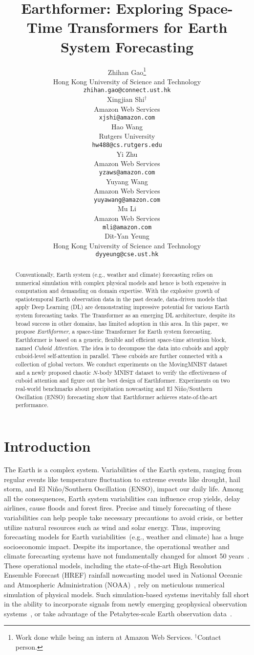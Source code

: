 \documentclass{article}
\title{Earthformer: Exploring Space-Time Transformers for Earth System Forecasting}
\author{Zhihan Gao\thanks{Work done while being an intern at Amazon Web Services. $^\dagger$Contact person.} \\
  Hong Kong University of Science and Technology\\
\texttt{zhihan.gao@connect.ust.hk} \\
  \And
  Xingjian Shi$^\dagger$\\
  Amazon Web Services \\
  \texttt{xjshi@amazon.com} \\
  \And
  Hao Wang \\
  Rutgers University\\
  \texttt{hw488@cs.rutgers.edu}\\
  \And
  Yi Zhu\\
  Amazon Web Services \\
  \texttt{yzaws@amazon.com} \\
  \And
  Yuyang Wang\\
  Amazon Web Services \\
  \texttt{yuyawang@amazon.com} \\
  \And
  Mu Li\\
  Amazon Web Services \\
  \texttt{mli@amazon.com} \\
  \And
  Dit-Yan Yeung\\
  Hong Kong University of Science and Technology \\
  \texttt{dyyeung@cse.ust.hk} \\
}
\def\nbody{$N$-body MNIST}
\begin{document}
\maketitle


\begin{abstract}
Conventionally, Earth system (e.g., weather and climate) forecasting relies on numerical simulation with complex physical models and hence is both expensive in computation and demanding on domain expertise. 
With the explosive growth of spatiotemporal Earth observation data in the past decade, data-driven models that apply Deep Learning (DL) are demonstrating impressive potential for various Earth system forecasting tasks.
The Transformer as an emerging DL architecture, despite its broad success in other domains, has limited adoption in this area.
In this paper, we propose \emph{Earthformer}, a space-time Transformer for Earth system forecasting. Earthformer is based on a generic, flexible and efficient space-time attention block, named \emph{Cuboid Attention}. The idea is to decompose the data into cuboids and apply cuboid-level self-attention in parallel. These cuboids are further connected with a collection of global vectors. We conduct experiments on the MovingMNIST dataset and a newly proposed chaotic \nbody{} dataset to verify the effectiveness of cuboid attention and figure out the best design of Earthformer. Experiments on two real-world benchmarks about precipitation nowcasting and El Niño/Southern Oscillation (ENSO) forecasting show that Earthformer achieves state-of-the-art performance.
\end{abstract}

\section{Introduction}

The Earth is a complex system. Variabilities of the Earth system, ranging from regular events like temperature fluctuation to extreme events like drought, hail storm, and El Niño/Southern Oscillation (ENSO), impact our daily life. Among all the consequences, Earth system variabilities can influence crop yields, delay airlines, cause floods and forest fires. Precise and timely forecasting of these variabilities can help people take necessary precautions to avoid crisis, or better utilize natural resources such as wind and solar energy. Thus, improving forecasting models for Earth variabilities~(e.g., weather and climate) has a huge socioeconomic impact. Despite its importance, the operational weather and climate forecasting systems have not fundamentally changed for almost 50 years~\cite{reichstein2019deep}. These operational models, including the state-of-the-art High Resolution Ensemble Forecast (HREF) rainfall nowcasting model used in National Oceanic and Atmospheric Administration (NOAA)~\cite{ravuri2021skilful}, rely on meticulous numerical simulation of physical models. Such simulation-based systems inevitably fall short in the ability to incorporate signals from newly emerging geophysical observation systems~\cite{goodman2019goes}, or take advantage of the Petabytes-scale Earth observation data~\cite{veillette2020sevir}.
\end{document}
